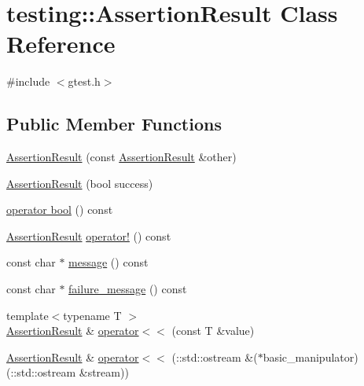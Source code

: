 \hypertarget{classtesting_1_1_assertion_result}{\section{testing\+:\+:Assertion\+Result Class Reference}
\label{classtesting_1_1_assertion_result}
}


{\ttfamily \#include $<$gtest.\+h$>$}

\subsection*{Public Member Functions}
\begin{DoxyCompactItemize}
\item 
\hyperlink{classtesting_1_1_assertion_result_a27788116f03f90aec4daf592fd809ead}{Assertion\+Result} (const \hyperlink{classtesting_1_1_assertion_result}{Assertion\+Result} \&other)
\item 
\hyperlink{classtesting_1_1_assertion_result_ade695178c05c4b2f82e92930c912fc25}{Assertion\+Result} (bool success)
\item 
\hyperlink{classtesting_1_1_assertion_result_af85b7852e6399467cd74df539810abcd}{operator bool} () const 
\item 
\hyperlink{classtesting_1_1_assertion_result}{Assertion\+Result} \hyperlink{classtesting_1_1_assertion_result_a85301ba52aa1efe89b79d1e3b59160cd}{operator!} () const 
\item 
const char $\ast$ \hyperlink{classtesting_1_1_assertion_result_ab20c91eba13e20f1b4ad89e3d15f69a8}{message} () const 
\item 
const char $\ast$ \hyperlink{classtesting_1_1_assertion_result_ae54fa82506c507a9dbc0f85d2cec652a}{failure\+\_\+message} () const 
\item 
{\footnotesize template$<$typename T $>$ }\\\hyperlink{classtesting_1_1_assertion_result}{Assertion\+Result} \& \hyperlink{classtesting_1_1_assertion_result_a3230efa81aafe7c61f5fb878cfa39e91}{operator$<$$<$} (const T \&value)
\item 
\hyperlink{classtesting_1_1_assertion_result}{Assertion\+Result} \& \hyperlink{classtesting_1_1_assertion_result_a43ae8a260843ce2ff3dc9af262672b8b}{operator$<$$<$} (\+::std\+::ostream \&($\ast$basic\+\_\+manipulator)(\+::std\+::ostream \&stream))
\end{DoxyCompactItemize}



